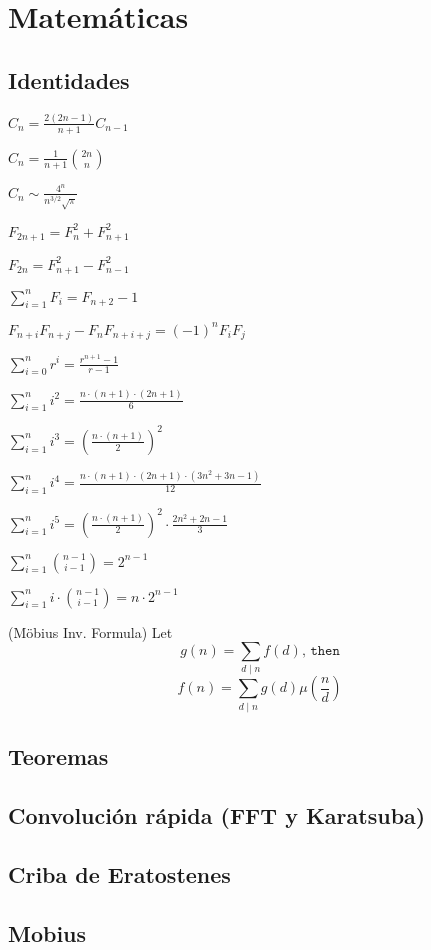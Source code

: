 \section{Matemáticas}
\subsection{Identidades}
    $C_n = \frac{2(2n-1)}{n+1} C_{n-1}$

    $C_n = \frac{1}{n+1} \binom{2n}{n}$

    $C_n \sim \frac{4^n}{n^{3/2}\sqrt{\pi}}$

    $F_{2n+1} = F_{n}^2 + F_{n+1}^2$

    $F_{2n} = F_{n+1}^2 - F_{n-1}^2$

    $\sum_{i=1}^n F_i = F_{n+2}-1$

    $F_{n+i}F_{n+j} - F_nF_{n+i+j} = (-1)^n F_iF_j$

    $\sum_{i=0}^n{r^i} = \frac{r^{n+1}-1}{r-1}$
    
    $\sum_{i=1}^n{i^2} = \frac{n\cdot(n+1)\cdot(2n+1)}{6}$

    $\sum_{i=1}^n{i^3} = \left(\frac{n\cdot(n+1)}{2}\right)^2$

    $\sum_{i=1}^n{i^4} = \frac{n\cdot(n+1)\cdot(2n+1)\cdot(3n^2+3n-1)}{12}$

    $\sum_{i=1}^{ n} i^5 = \left(\frac{ n \cdot (n+1)}{2}\right) ^2 \cdot \frac{2 n ^2 + 2n - 1}{3}$

    $\sum_{i=1}^n{\binom{n-1}{i-1}} = 2^{n-1}$

    $\sum_{i=1}^n{i\cdot\binom{n-1}{i-1}} = n\cdot2^{n-1}$

    (Möbius Inv. Formula)
    Let
    \[g(n) = \sum_{d\mid n} f(d) \texttt{, then}\]
    \[f(n)=\sum_{d\mid n} g(d) \mu\left(\frac{n}{d}\right)\]

\subsection{Teoremas}


\subsection{Convolución rápida (FFT y Karatsuba)}

\subsection{Criba de Eratostenes}

\subsection{Mobius}

